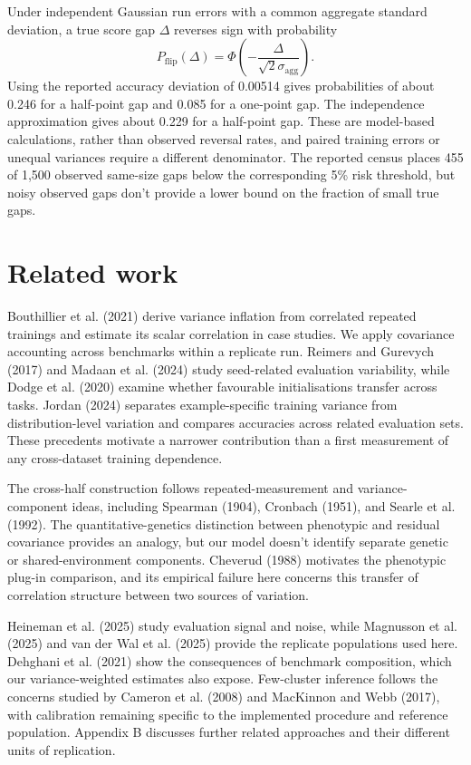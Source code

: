 \documentclass{article}
\begin{document}
Under independent Gaussian run errors with a common aggregate standard deviation, a true score gap $\Delta$ reverses sign with probability
\begin{equation}
P_{\mathrm{flip}}(\Delta)=\Phi\left(-\frac{\Delta}{\sqrt{2}\sigma_{\mathrm{agg}}}\right).
\end{equation}
Using the reported accuracy deviation of 0.00514 gives probabilities of about 0.246 for a half-point gap and 0.085 for a one-point gap. The independence approximation gives about 0.229 for a half-point gap. These are model-based calculations, rather than observed reversal rates, and paired training errors or unequal variances require a different denominator. The reported census places 455 of 1,500 observed same-size gaps below the corresponding 5\% risk threshold, but noisy observed gaps don't provide a lower bound on the fraction of small true gaps.

\section{Related work}
Bouthillier et al. (2021) derive variance inflation from correlated repeated trainings and estimate its scalar correlation in case studies. We apply covariance accounting across benchmarks within a replicate run. Reimers and Gurevych (2017) and Madaan et al. (2024) study seed-related evaluation variability, while Dodge et al. (2020) examine whether favourable initialisations transfer across tasks. Jordan (2024) separates example-specific training variance from distribution-level variation and compares accuracies across related evaluation sets. These precedents motivate a narrower contribution than a first measurement of any cross-dataset training dependence.

The cross-half construction follows repeated-measurement and variance-component ideas, including Spearman (1904), Cronbach (1951), and Searle et al. (1992). The quantitative-genetics distinction between phenotypic and residual covariance provides an analogy, but our model doesn't identify separate genetic or shared-environment components. Cheverud (1988) motivates the phenotypic plug-in comparison, and its empirical failure here concerns this transfer of correlation structure between two sources of variation.

Heineman et al. (2025) study evaluation signal and noise, while Magnusson et al. (2025) and van der Wal et al. (2025) provide the replicate populations used here. Dehghani et al. (2021) show the consequences of benchmark composition, which our variance-weighted estimates also expose. Few-cluster inference follows the concerns studied by Cameron et al. (2008) and MacKinnon and Webb (2017), with calibration remaining specific to the implemented procedure and reference population. Appendix B discusses further related approaches and their different units of replication.
\end{document}
